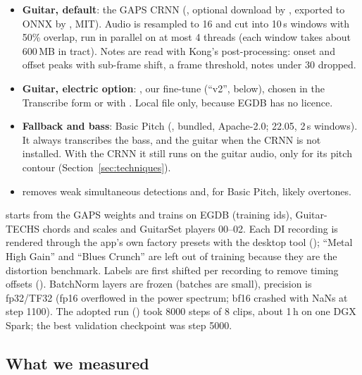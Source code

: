 \begin{inapp}
\begin{itemize}
\item \textbf{Guitar, default}: the GAPS CRNN (,
  optional download by , exported
  to ONNX by , MIT). Audio is resampled to
  16\kHz{} and cut into 10\,s windows with 50\% overlap, run in parallel on at
  most 4 threads (each window takes about 600\,MB in tract). Notes are read
  with Kong's post-processing: onset and offset peaks with sub-frame shift, a
  frame threshold, notes under 30\ms{} dropped.
\item \textbf{Guitar, electric option}: , our
  fine-tune (``v2'', below), chosen in the Transcribe form or with
  . Local file only, because EGDB has no licence.
\item \textbf{Fallback and bass}: Basic Pitch (,
  bundled, Apache-2.0; 22.05\kHz, 2\,s windows). It always transcribes the bass,
  and the guitar when the CRNN is not installed. With the CRNN it still runs on
  the guitar audio, only for its pitch contour (Section~\ref{sec:techniques}).
\item {} removes weak simultaneous detections and, for Basic
  Pitch, likely overtones.
\end{itemize}
\end{inapp}

\begin{inapp}
 starts from the GAPS weights and trains on
EGDB (training ids), Guitar-TECHS chords and scales and GuitarSet players
00--02. Each DI recording is rendered through the app's own factory presets with
the desktop tool  (); ``Metal High
Gain'' and ``Blues Crunch'' are left out of training because they are the
distortion benchmark. Labels are first shifted per recording to remove timing
offsets (). BatchNorm layers are frozen (batches are
small), precision is fp32/TF32 (fp16 overflowed in the power spectrum; bf16
crashed with NaNs at step 1100). The adopted run () took
8000 steps of 8 clips, about 1\,h on one DGX Spark; the best validation
checkpoint was step 5000.
\end{inapp}

\subsection{What we measured}


